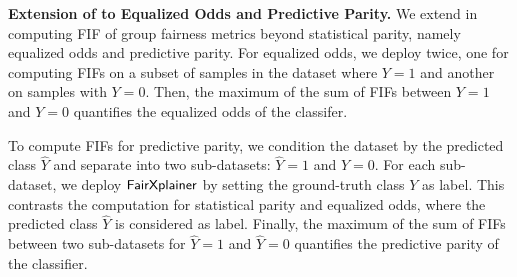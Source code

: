 






\noindent\textbf{Extension of {\fairXplainer} to Equalized Odds and Predictive Parity.} 
We extend {\fairXplainer} in computing FIF of group fairness metrics beyond statistical parity, namely equalized odds and predictive parity. For equalized odds, we deploy {\fairXplainer} twice, one for computing FIFs on a subset of samples in the dataset where $ Y = 1 $ and another on samples with $ Y = 0 $. Then, the maximum of the sum of FIFs between $ Y = 1 $ and $ Y = 0 $ quantifies the equalized odds of the classifer.  


To compute FIFs for predictive parity, we condition the dataset by the predicted class $ \widehat{Y} $ and separate into two sub-datasets: $ \widehat{Y} = 1 $ and  $ \widehat{Y} = 0 $. For each sub-dataset, we deploy $ \mathsf{FairXplainer} $ by setting the ground-truth class $ Y $ as label. This contrasts the computation for  statistical parity and equalized odds, where the predicted class $ \widehat{Y} $ is considered as label. Finally, the maximum of the sum of FIFs between two sub-datasets for $ \widehat{Y} = 1 $ and  $ \widehat{Y} = 0 $ quantifies the predictive parity of the classifier.

 